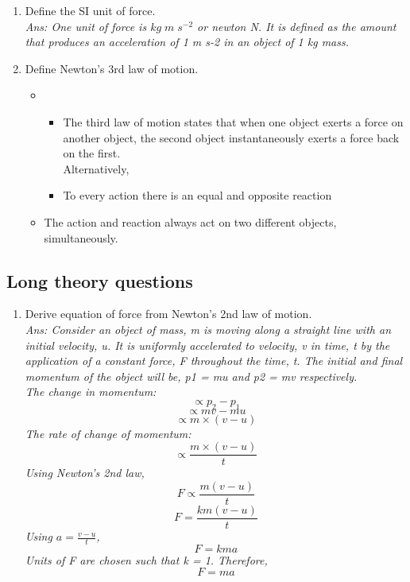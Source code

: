 \documentclass[12pt]{article}
\begin{document}
\begin{enumerate}
	\item Define the SI unit of force. \\
		{\itshape
			Ans:  One unit of force is $ kg \; m \; s^{-2} $ or newton N.
			It is defined as the amount that produces an 
			acceleration of 1 m s-2 in an object of 1 kg mass.
		}

	\item Define Newton's 3rd law of motion. \\
		{\itshape
			\begin{itemize}
				\item \begin{itemize}
					\item The third law of motion states that when one
					object exerts a force on another object, the
					second object instantaneously exerts a force
					back on the first. \\ Alternatively,
					\item To every action there is an equal
						and opposite reaction
				\end{itemize}
				\item The action and reaction always act on two different objects, simultaneously.
			\end{itemize}
		}

\end{enumerate}

\subsection*{Long theory questions}
\begin{enumerate}
	\item Derive equation of force from Newton's 2nd law of motion. \\
		{\itshape Ans:
			Consider an object of mass, m is moving along
			a straight line with an initial velocity, u. It is
			uniformly accelerated to velocity, v in time, t
			by the application of a constant force, F
			throughout the time, t. The initial and final
			momentum of the object will be, p1 = mu and p2 = mv respectively. \\
			The change in momentum:
			\[\propto p_2 - p_1\]
			\[\propto mv - mu\]
			\[\propto m \times (v - u)\]
			The rate of change of momentum: \[ \propto  \frac {m \times (v - u)}{t} \]
			Using Newton's 2nd law, 
			\[ F \propto \frac{m(v-u)}{t} \]
			\[ F = \frac{km(v-u)}{t} \]
			Using $ a = \frac{v-u}{t} $, 
			\[ F = kma \]
			Units of F are chosen such that k = 1. Therefore,
			\[ F = ma \]
		}
\end{enumerate}
\end{document}
